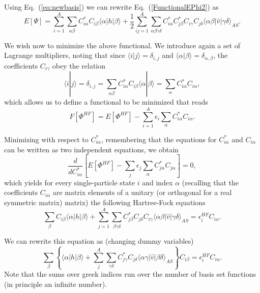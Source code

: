 Using Eq.~(\ref{eq:newbasis}) we can rewrite
Eq.~(\ref{FunctionalEPhi2}) as
\begin{equation}
  E[\Psi] 
  = \sum_{i=1}^A \sum_{\alpha\beta} C^*_{i\alpha}C_{i\beta}\langle \alpha | h | \beta \rangle +
  \frac{1}{2}\sum_{ij=1}^A\sum_{{\alpha\beta\gamma\delta}} C^*_{i\alpha}C^*_{j\beta}C_{i\gamma}C_{j\delta}\langle \alpha\beta|\hat{v}|\gamma\delta\rangle_{AS}. \label{FunctionalEPhi3}
\end{equation}


We wish now to minimize the above functional. We introduce again a set
of Lagrange multipliers, noting that since $\langle i | j \rangle
= \delta_{i,j}$ and $\langle \alpha | \beta \rangle
= \delta_{\alpha,\beta}$, the coefficients $C_{i\gamma}$ obey the
relation
\[
 \langle i | j \rangle=\delta_{i,j}=\sum_{\alpha\beta} C^*_{i\alpha}C_{i\beta}\langle \alpha | \beta \rangle=
\sum_{\alpha} C^*_{i\alpha}C_{i\alpha},
\]
which allows us to define a functional to be minimized that reads
\begin{equation}
  F[\Phi^{HF}]=E[\Phi^{HF}] - \sum_{i=1}^A\epsilon_i\sum_{\alpha} C^*_{i\alpha}C_{i\alpha}.
\end{equation}







Minimizing with respect to $C^*_{i\alpha}$, remembering that the
equations for $C^*_{i\alpha}$ and $C_{i\alpha}$ can be written as two
independent equations, we obtain
\[
\frac{d}{dC^*_{i\alpha}}\left[  E[\Phi^{HF}] - \sum_{j}\epsilon_j\sum_{\alpha} C^*_{j\alpha}C_{j\alpha}\right]=0,
\]
which yields for every single-particle state $i$ and index $\alpha$
(recalling that the coefficients $C_{i\alpha}$ are matrix elements of
a unitary (or orthogonal for a real symmetric matrix) matrix) the
following Hartree-Fock equations
\[
\sum_{\beta} C_{i\beta}\langle \alpha | h | \beta \rangle+
\sum_{j=1}^A\sum_{\beta\gamma\delta} C^*_{j\beta}C_{j\delta}C_{i\gamma}\langle \alpha\beta|\hat{v}|\gamma\delta\rangle_{AS}=\epsilon_i^{HF}C_{i\alpha}.
\]


We can rewrite this equation as (changing dummy variables)
\[
\sum_{\beta} \left\{\langle \alpha | h | \beta \rangle+
\sum_{j}^A\sum_{\gamma\delta} C^*_{j\gamma}C_{j\delta}\langle \alpha\gamma|\hat{v}|\beta\delta\rangle_{AS}\right\}C_{i\beta}=\epsilon_i^{HF}C_{i\alpha}.
\]
Note that the sums over greek indices run over the number of basis set
functions (in principle an infinite number).





